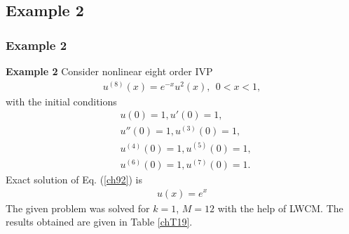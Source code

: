 \documentclass{beamer}
\begin{document}
\subsection*{Example 2}
\begin{frame}\frametitle{Example 2}
	\justifying
\textbf{Example 2} Consider nonlinear eight order IVP \cite{Raju}
\begin{eqnarray}\label{ch92}
u^{(8)}(x)=e^{-x}u^{2}(x),~~0<x<1,
\end{eqnarray}
\small
with the initial conditions
\begin{align}\label{chsoh9}
& u(0)=1, u'(0)=1,\nonumber\\
&u''(0)=1, u^{(3)}(0)=1,\\
&u^{(4)}(0)=1, u^{(5)}(0)=1,\nonumber\\
&u^{(6)}(0)=1, u^{(7)}(0)=1.\nonumber
\end{align}
\small
Exact solution of Eq. (\ref{ch92}) is \cite{Raju}
\begin{eqnarray}\label{ch93}
u(x)=e^{x}
\end{eqnarray}
\small
The given problem was solved for $k=1$, $M=12$ with the help of LWCM. The results obtained are given in Table \ref{chT19}.
\end{frame}
\end{document}
